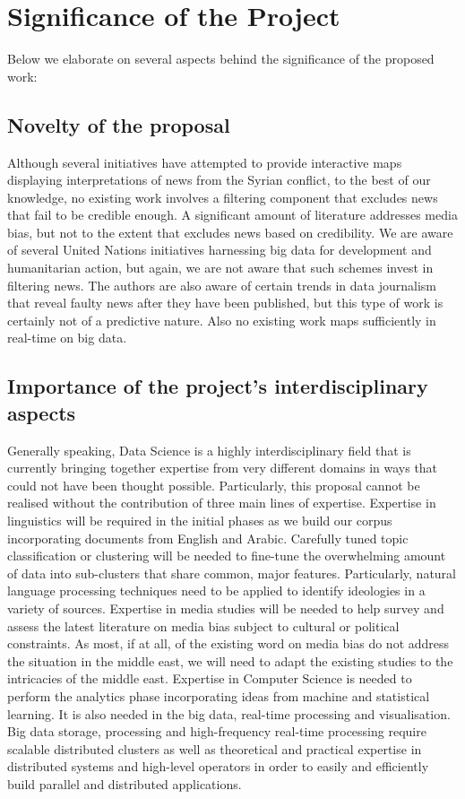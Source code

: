 \section{Significance of the Project}

Below we elaborate on several aspects behind the significance of the proposed work:

\subsection{Novelty of the proposal}

Although several initiatives have attempted to provide interactive maps displaying interpretations of news from the Syrian conflict, to the best of our knowledge, no existing work involves a filtering component that excludes news that fail to be credible enough. A significant amount of literature addresses media bias, but not to the extent that excludes news based on credibility. We are aware of several United Nations initiatives harnessing big data for development and humanitarian action, but again, we are not aware that such schemes invest in filtering news. The authors are also aware of certain trends in data journalism that reveal faulty news after they have been published, but this type of work is certainly not of a predictive nature. Also no existing work maps sufficiently in real-time on big data. 


\subsection{Importance of the project's interdisciplinary aspects}

Generally speaking, Data Science is a highly interdisciplinary field that is currently bringing together expertise from very different domains in ways that could not have been thought possible. Particularly, this proposal cannot be realised without the contribution of three main lines of expertise. Expertise in linguistics will be required in the initial phases as we build our corpus incorporating documents from English and Arabic. Carefully tuned topic classification or clustering will be needed to fine-tune the overwhelming amount of data into sub-clusters that share common, major features. Particularly, natural language processing techniques need to be applied to identify ideologies in a variety of sources. Expertise in media studies will be needed to help survey and assess the latest literature on media bias subject to cultural or political constraints. As most, if at all, of the existing word on media bias do not address the situation in the middle east, we will need to adapt the existing studies to the intricacies of the middle east. Expertise in Computer Science is needed to perform the analytics phase incorporating ideas from machine and statistical learning. It is also needed in the big data, real-time processing and visualisation. Big data storage, processing and high-frequency real-time processing require scalable distributed clusters as well as theoretical and practical expertise in distributed systems and high-level operators in order to easily and efficiently build parallel and distributed applications.


